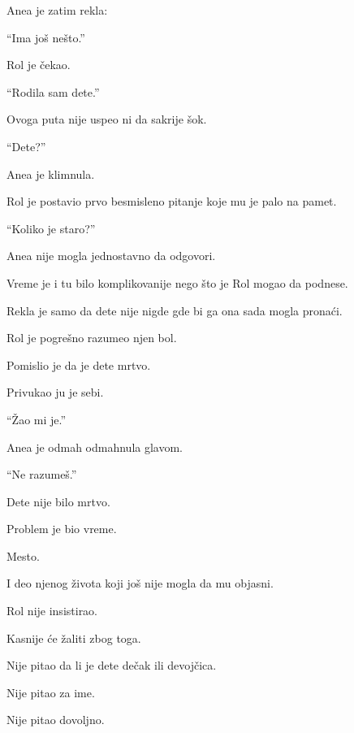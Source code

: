 Anea je zatim rekla:

``Ima još nešto.''

\bigskip

Rol je čekao.

\bigskip

``Rodila sam dete.''

\bigskip

Ovoga puta nije uspeo ni da sakrije šok.

``Dete?''

\bigskip

Anea je klimnula.

\bigskip

Rol je postavio prvo besmisleno pitanje koje mu je palo na pamet.

``Koliko je staro?''

\bigskip

Anea nije mogla jednostavno da odgovori.

Vreme je i tu bilo komplikovanije nego što je Rol mogao da podnese.

\bigskip

Rekla je samo da dete nije nigde gde bi ga ona sada mogla pronaći.

\bigskip

Rol je pogrešno razumeo njen bol.

Pomislio je da je dete mrtvo.

Privukao ju je sebi.

``Žao mi je.''

\bigskip

Anea je odmah odmahnula glavom.

``Ne razumeš.''

\bigskip

Dete nije bilo mrtvo.

Problem je bio vreme.

Mesto.

I deo njenog života koji još nije mogla da mu objasni.

\bigskip

Rol nije insistirao.

\bigskip

Kasnije će žaliti zbog toga.

\bigskip

Nije pitao da li je dete dečak ili devojčica.

Nije pitao za ime.

Nije pitao dovoljno.

\bigskip

